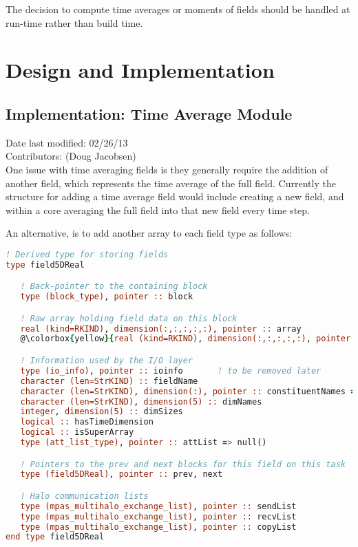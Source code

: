 \documentclass[11pt]{report}
\begin{document}
The decision to compute time averages or moments of fields should be handled at
run-time rather than build time.


\chapter{Design and Implementation}

\section{Implementation: Time Average Module}
Date last modified: 02/26/13 \\
Contributors: (Doug Jacobsen) \\

One issue with time averaging fields is they generally require the addition of
another field, which represents the time average of the full field. Currently
the structure for adding a time average field would include creating a new
field, and within a core averaging the full field into that new field every
time step.

An alternative, is to add another array to each field type as follows:
{\tiny
\begin{lstlisting}[language=fortran,escapechar=@,frame=single]
! Derived type for storing fields
type field5DReal

   ! Back-pointer to the containing block
   type (block_type), pointer :: block

   ! Raw array holding field data on this block
   real (kind=RKIND), dimension(:,:,:,:,:), pointer :: array
   @\colorbox{yellow}{real (kind=RKIND), dimension(:,:,:,:,:), pointer :: tavgArray}@

   ! Information used by the I/O layer
   type (io_info), pointer :: ioinfo       ! to be removed later
   character (len=StrKIND) :: fieldName
   character (len=StrKIND), dimension(:), pointer :: constituentNames => null()
   character (len=StrKIND), dimension(5) :: dimNames
   integer, dimension(5) :: dimSizes
   logical :: hasTimeDimension
   logical :: isSuperArray
   type (att_list_type), pointer :: attList => null()     

   ! Pointers to the prev and next blocks for this field on this task
   type (field5DReal), pointer :: prev, next

   ! Halo communication lists
   type (mpas_multihalo_exchange_list), pointer :: sendList
   type (mpas_multihalo_exchange_list), pointer :: recvList
   type (mpas_multihalo_exchange_list), pointer :: copyList
end type field5DReal
\end{lstlisting}
}
\end{document}
